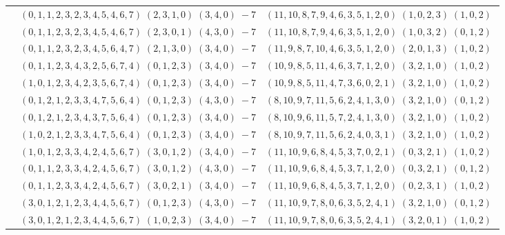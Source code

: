 \documentclass[11pt]{article}
\begin{document}
\begin{longtable}[l]{|c|c|c|}
 \cline{2-3} 
 & $(0 ,1 ,1 ,2 ,3 ,2 ,3 ,4 ,5 ,4 ,6 ,7) \;(2 ,3 ,1 ,0) \;(3 ,4 ,0) \;-7$ & $(11 ,10 ,8 ,7 ,9 ,4 ,6 ,3 ,5 ,1 ,2 ,0) \;(1 ,0 ,2 ,3) \;(1 ,0 ,2) \;$\\ 
 \cline{2-3} 
 & $(0 ,1 ,1 ,2 ,3 ,2 ,3 ,4 ,5 ,4 ,6 ,7) \;(2 ,3 ,0 ,1) \;(4 ,3 ,0) \;-7$ & $(11 ,10 ,8 ,7 ,9 ,4 ,6 ,3 ,5 ,1 ,2 ,0) \;(1 ,0 ,3 ,2) \;(0 ,1 ,2) \;$\\ 
 \cline{2-3} 
 & $(0 ,1 ,1 ,2 ,3 ,2 ,3 ,4 ,5 ,6 ,4 ,7) \;(2 ,1 ,3 ,0) \;(3 ,4 ,0) \;-7$ & $(11 ,9 ,8 ,7 ,10 ,4 ,6 ,3 ,5 ,1 ,2 ,0) \;(2 ,0 ,1 ,3) \;(1 ,0 ,2) \;$\\ 
 \cline{2-3} 
 & $(0 ,1 ,1 ,2 ,3 ,4 ,3 ,2 ,5 ,6 ,7 ,4) \;(0 ,1 ,2 ,3) \;(3 ,4 ,0) \;-7$ & $(10 ,9 ,8 ,5 ,11 ,4 ,6 ,3 ,7 ,1 ,2 ,0) \;(3 ,2 ,1 ,0) \;(1 ,0 ,2) \;$\\ 
 \cline{2-3} 
 & $(1 ,0 ,1 ,2 ,3 ,4 ,2 ,3 ,5 ,6 ,7 ,4) \;(0 ,1 ,2 ,3) \;(3 ,4 ,0) \;-7$ & $(10 ,9 ,8 ,5 ,11 ,4 ,7 ,3 ,6 ,0 ,2 ,1) \;(3 ,2 ,1 ,0) \;(1 ,0 ,2) \;$\\ 
 \cline{2-3} 
 & $(0 ,1 ,2 ,1 ,2 ,3 ,3 ,4 ,7 ,5 ,6 ,4) \;(0 ,1 ,2 ,3) \;(4 ,3 ,0) \;-7$ & $(8 ,10 ,9 ,7 ,11 ,5 ,6 ,2 ,4 ,1 ,3 ,0) \;(3 ,2 ,1 ,0) \;(0 ,1 ,2) \;$\\ 
 \cline{2-3} 
 & $(0 ,1 ,2 ,1 ,2 ,3 ,4 ,3 ,7 ,5 ,6 ,4) \;(0 ,1 ,2 ,3) \;(3 ,4 ,0) \;-7$ & $(8 ,10 ,9 ,6 ,11 ,5 ,7 ,2 ,4 ,1 ,3 ,0) \;(3 ,2 ,1 ,0) \;(1 ,0 ,2) \;$\\ 
 \cline{2-3} 
 & $(1 ,0 ,2 ,1 ,2 ,3 ,3 ,4 ,7 ,5 ,6 ,4) \;(0 ,1 ,2 ,3) \;(3 ,4 ,0) \;-7$ & $(8 ,10 ,9 ,7 ,11 ,5 ,6 ,2 ,4 ,0 ,3 ,1) \;(3 ,2 ,1 ,0) \;(1 ,0 ,2) \;$\\ 
 \cline{2-3} 
 & $(1 ,0 ,1 ,2 ,3 ,3 ,4 ,2 ,4 ,5 ,6 ,7) \;(3 ,0 ,1 ,2) \;(3 ,4 ,0) \;-7$ & $(11 ,10 ,9 ,6 ,8 ,4 ,5 ,3 ,7 ,0 ,2 ,1) \;(0 ,3 ,2 ,1) \;(1 ,0 ,2) \;$\\ 
 \cline{2-3} 
 & $(0 ,1 ,1 ,2 ,3 ,3 ,4 ,2 ,4 ,5 ,6 ,7) \;(3 ,0 ,1 ,2) \;(4 ,3 ,0) \;-7$ & $(11 ,10 ,9 ,6 ,8 ,4 ,5 ,3 ,7 ,1 ,2 ,0) \;(0 ,3 ,2 ,1) \;(0 ,1 ,2) \;$\\ 
 \cline{2-3} 
 & $(0 ,1 ,1 ,2 ,3 ,3 ,4 ,2 ,4 ,5 ,6 ,7) \;(3 ,0 ,2 ,1) \;(3 ,4 ,0) \;-7$ & $(11 ,10 ,9 ,6 ,8 ,4 ,5 ,3 ,7 ,1 ,2 ,0) \;(0 ,2 ,3 ,1) \;(1 ,0 ,2) \;$\\ 
 \cline{2-3} 
 & $(3 ,0 ,1 ,2 ,1 ,2 ,3 ,4 ,4 ,5 ,6 ,7) \;(0 ,1 ,2 ,3) \;(4 ,3 ,0) \;-7$ & $(11 ,10 ,9 ,7 ,8 ,0 ,6 ,3 ,5 ,2 ,4 ,1) \;(3 ,2 ,1 ,0) \;(0 ,1 ,2) \;$\\ 
 \cline{2-3} 
 & $(3 ,0 ,1 ,2 ,1 ,2 ,3 ,4 ,4 ,5 ,6 ,7) \;(1 ,0 ,2 ,3) \;(3 ,4 ,0) \;-7$ & $(11 ,10 ,9 ,7 ,8 ,0 ,6 ,3 ,5 ,2 ,4 ,1) \;(3 ,2 ,0 ,1) \;(1 ,0 ,2) \;$\\ 

\end{longtable}
\end{document}
